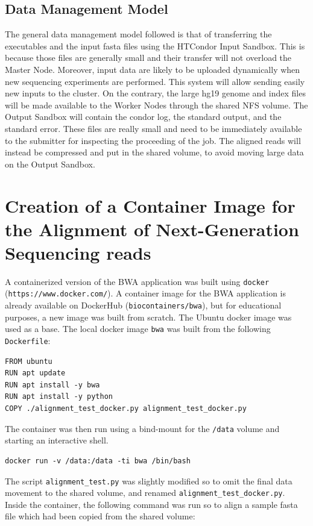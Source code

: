 \documentclass{article}
\begin{document}
\subsection{Data Management Model}
The general data management model followed is that of transferring the executables and the input fasta files using the HTCondor Input Sandbox.
This is because those files are generally small and their transfer will not overload the Master Node.
Moreover, input data are likely to be uploaded dynamically when new sequencing experiments are performed.
This system will allow sending easily new inputs to the cluster.
On the contrary, the large hg19 genome and index files will be made available to the Worker Nodes through the shared NFS volume.
The Output Sandbox will contain the condor log, the standard output, and the standard error.
These files are really small and need to be immediately available to the submitter for inspecting the proceeding of the job.
The aligned reads will instead be compressed and put in the shared volume, to avoid moving large data on the Output Sandbox.

\section{Creation of a Container Image for the Alignment of Next-Generation Sequencing reads}
A containerized version of the BWA application was built using \texttt{docker} (\texttt{https://www.docker.com/}).
A container image for the BWA application is already available on DockerHub (\texttt{biocontainers/bwa}), but for educational purposes, a new image was built from scratch.
The Ubuntu docker image was used as a base.
The local docker image \texttt{bwa} was built from the following \texttt{Dockerfile}:

\begin{lstlisting}
FROM ubuntu
RUN apt update
RUN apt install -y bwa
RUN apt install -y python
COPY ./alignment_test_docker.py alignment_test_docker.py
\end{lstlisting}

The container was then run using a bind-mount for the \texttt{/data} volume and starting an interactive shell.

\begin{lstlisting}
docker run -v /data:/data -ti bwa /bin/bash
\end{lstlisting}

The script \texttt{alignment\_test.py} was slightly modified so to omit the final data movement to the shared volume, and renamed \texttt{alignment\_test\_docker.py}.
Inside the container, the following command was run so to align a sample fasta file which had been copied from the shared volume:
\end{document}
